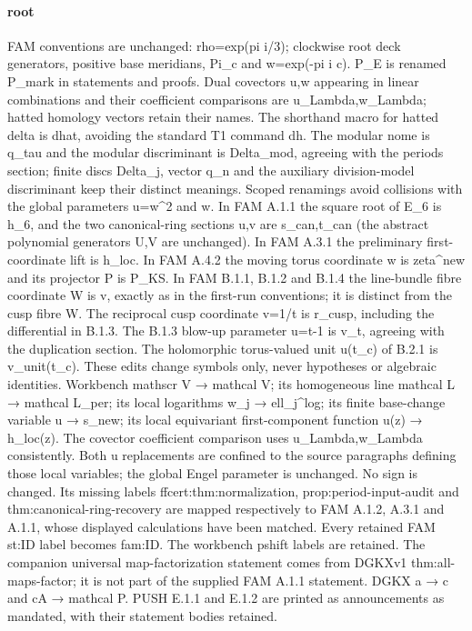 \documentclass[11pt,a4paper]{article}
\theoremstyle{plain}
\theoremstyle{definition}
\begin{document}
\paragraph{root}
FAM conventions are unchanged:\allowbreak{} rho=exp(pi i/\allowbreak{}3); clockwise root deck generators, positive base meridians, Pi\_\allowbreak{}c and w=exp(-pi i c). P\_\allowbreak{}E is renamed P\_\allowbreak{}mark in statements and proofs. Dual covectors u,w appearing in linear combinations and their coefficient comparisons are u\_\allowbreak{}Lambda,w\_\allowbreak{}Lambda; hatted homology vectors retain their names. The shorthand macro for hatted delta is dhat, avoiding the standard T1 command dh. The modular nome is q\_\allowbreak{}tau and the modular discriminant is Delta\_\allowbreak{}mod, agreeing with the periods section; finite discs Delta\_\allowbreak{}j, vector q\_\allowbreak{}n and the auxiliary division-model discriminant keep their distinct meanings.
Scoped renamings avoid collisions with the global parameters u=w\textasciicircum{}2 and w. In FAM A.1.1 the square root of E\_\allowbreak{}6 is h\_\allowbreak{}6, and the two canonical-ring sections u,v are s\_\allowbreak{}can,t\_\allowbreak{}can (the abstract polynomial generators U,V are unchanged). In FAM A.3.1 the preliminary first-coordinate lift is h\_\allowbreak{}loc. In FAM A.4.2 the moving torus coordinate w is zeta\textasciicircum{}new and its projector P is P\_\allowbreak{}KS. In FAM B.1.1, B.1.2 and B.1.4 the line-bundle fibre coordinate W is v, exactly as in the first-run conventions; it is distinct from the cusp fibre W. The reciprocal cusp coordinate v=1/\allowbreak{}t is r\_\allowbreak{}cusp, including the differential in B.1.3. The B.1.3 blow-up parameter u=t-1 is v\_\allowbreak{}t, agreeing with the duplication section. The holomorphic torus-valued unit u(t\_\allowbreak{}c) of B.2.1 is v\_\allowbreak{}unit(t\_\allowbreak{}c). These edits change symbols only, never hypotheses or algebraic identities.
Workbench mathscr V → mathcal V; its homogeneous line mathcal L → mathcal L\_\allowbreak{}per; its local logarithms w\_\allowbreak{}j → ell\_\allowbreak{}j\textasciicircum{}log; its finite base-change variable u → s\_\allowbreak{}new; its local equivariant first-component function u(z) → h\_\allowbreak{}loc(z). The covector coefficient comparison uses u\_\allowbreak{}Lambda,w\_\allowbreak{}Lambda consistently. Both u replacements are confined to the source paragraphs defining those local variables; the global Engel parameter is unchanged. No sign is changed. Its missing labels ffcert:\allowbreak{}thm:\allowbreak{}normalization, prop:\allowbreak{}period-input-audit and thm:\allowbreak{}canonical-ring-recovery are mapped respectively to FAM A.1.2, A.3.1 and A.1.1, whose displayed calculations have been matched.
Every retained FAM st:\allowbreak{}ID label becomes fam:\allowbreak{}ID. The workbench pshift labels are retained. The companion universal map-factorization statement comes from DGKXv1 thm:\allowbreak{}all-maps-factor; it is not part of the supplied FAM A.1.1 statement. DGKX a → c and cA → mathcal P. PUSH E.1.1 and E.1.2 are printed as announcements as mandated, with their statement bodies retained.
\end{document}
